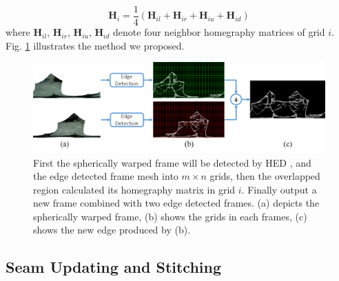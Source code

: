 \documentclass[conference]{IEEEtran}
\begin{document}
\begin{equation}
\textbf{H}_{i} = \frac{1}{4}\left(\textbf{H}_{il}+\textbf{H}_{ir}+\textbf{H}_{iu}+\textbf{H}_{id}\right)
\end{equation} 
where $\textbf{H}_{il}$, 
$\textbf{H}_{ir}$, 
$\textbf{H}_{iu}$, 
$\textbf{H}_{id}$ 
denote four neighbor homegraphy matrices of grid 
$i$.
Fig. \ref{fig:p8} illustrates the method we proposed.
\begin{figure}[!htpb]
\centering
\includegraphics[scale=0.22]{picture41.png}
\caption{First the spherically warped frame will be detected by HED \cite{xie2015holistically}, and the edge detected frame mesh into $m \times n$ grids, then the overlapped region calculated its homegraphy matrix in grid $i$.
Finally output a new frame combined with two edge detected frames. (a) depicts the spherically
warped frame, (b) shows the grids in each frames, (c) shows the new edge produced by (b).}
\label{fig:p8}
\end{figure}

\subsection{Seam Updating and Stitching}
\label{ssec:stitching}
\end{document}
